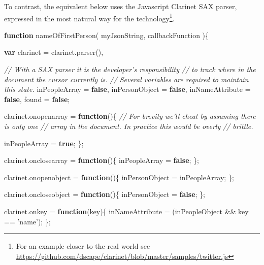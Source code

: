 \documentclass[12pt, ]{article}
\newenvironment{Shaded}{}{}
\newcommand{\KeywordTok}[1]{\textcolor[rgb]{0.00,0.44,0.13}{\textbf{{#1}}}}
\newcommand{\StringTok}[1]{\textcolor[rgb]{0.25,0.44,0.63}{{#1}}}
\newcommand{\CommentTok}[1]{\textcolor[rgb]{0.38,0.63,0.69}{\textit{{#1}}}}
\newcommand{\OtherTok}[1]{\textcolor[rgb]{0.00,0.44,0.13}{{#1}}}
\newcommand{\FunctionTok}[1]{\textcolor[rgb]{0.02,0.16,0.49}{{#1}}}
\newcommand{\NormalTok}[1]{{#1}}
\begin{document}
To contrast, the equivalent below uses the Javascript Clarinet SAX
parser, expressed in the most natural way for the technology\footnote{For
  an example closer to the real world see
  \url{https://github.com/dscape/clarinet/blob/master/samples/twitter.js}}.

\begin{Shaded}
\begin{Highlighting}[]
\KeywordTok{function} \FunctionTok{nameOfFirstPerson}\NormalTok{( myJsonString, callbackFunction )\{}


   \KeywordTok{var} \NormalTok{clarinet = }\OtherTok{clarinet}\NormalTok{.}\FunctionTok{parser}\NormalTok{(),}
   
       \CommentTok{// With a SAX parser it is the developer's responsibility }
       \CommentTok{// to track where in the document the cursor currently is.}
       \CommentTok{// Several variables are required to maintain this state.        }
       \NormalTok{inPeopleArray = }\KeywordTok{false}\NormalTok{,   }
       \NormalTok{inPersonObject = }\KeywordTok{false}\NormalTok{,}
       \NormalTok{inNameAttribute = }\KeywordTok{false}\NormalTok{,}
       \NormalTok{found = }\KeywordTok{false}\NormalTok{;}
   
   \OtherTok{clarinet}\NormalTok{.}\FunctionTok{onopenarray} \NormalTok{= }\KeywordTok{function}\NormalTok{()\{}
      \CommentTok{// For brevity we'll cheat by assuming there is only one}
      \CommentTok{// array in the document. In practice this would be overly}
      \CommentTok{// brittle.}
      
      \NormalTok{inPeopleArray = }\KeywordTok{true}\NormalTok{; }
   \NormalTok{\};}
   
   \OtherTok{clarinet}\NormalTok{.}\FunctionTok{onclosearray} \NormalTok{= }\KeywordTok{function}\NormalTok{()\{}
      \NormalTok{inPeopleArray = }\KeywordTok{false}\NormalTok{;}
   \NormalTok{\};   }
   
   \OtherTok{clarinet}\NormalTok{.}\FunctionTok{onopenobject} \NormalTok{= }\KeywordTok{function}\NormalTok{()\{}
      \NormalTok{inPersonObject = inPeopleArray; }
   \NormalTok{\};}
   
   \OtherTok{clarinet}\NormalTok{.}\FunctionTok{oncloseobject} \NormalTok{= }\KeywordTok{function}\NormalTok{()\{}
      \NormalTok{inPersonObject = }\KeywordTok{false}\NormalTok{;}
   \NormalTok{\};   }
      
   \OtherTok{clarinet}\NormalTok{.}\FunctionTok{onkey} \NormalTok{= }\KeywordTok{function}\NormalTok{(key)\{}
      \NormalTok{inNameAttribute = (inPeopleObject && key == }\StringTok{'name'}\NormalTok{);}
   \NormalTok{\};}


\end{Highlighting}
\end{Shaded}
\end{document}
